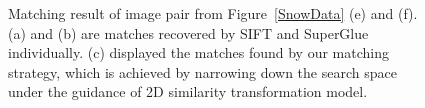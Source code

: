 \begin{figure}[htbp]
\begin{center}
{\begin{minipage}[t]{1\linewidth}
			\end{minipage}%
		}
		\caption{Matching result of image pair from Figure~\ref{SnowData} (e) and (f). (a) and (b) are matches recovered by SIFT and SuperGlue individually. (c) displayed the matches found by our matching strategy, which is achieved by narrowing down the search space under the guidance of 2D similarity transformation model.}
		\label{Matchresult}
	\end{center}
\end{figure} 
